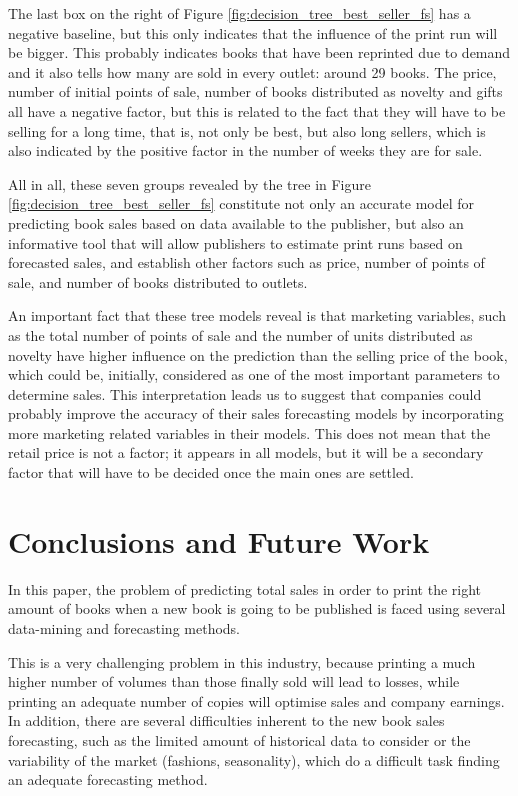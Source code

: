 \documentclass[a4paper,10pt,twocolumn,preprint,3p]{elsarticle}
\begin{document}
The last box on the right of Figure
\ref{fig:decision_tree_best_seller_fs} has a negative baseline, but
this only indicates that the influence of the print run will be
bigger. This probably indicates books that have been reprinted due to
demand and it also tells how many are sold in every outlet: around 29
books. The price, number of initial points of sale, number of books
distributed as novelty and gifts all have a negative factor, but this
is related to the fact that they will have to be selling for a long
time, that is, not only be best, but also long sellers, which is also
indicated by the positive factor in the number of weeks they are for
sale. 

All in all, these seven groups revealed by the tree in Figure
\ref{fig:decision_tree_best_seller_fs} constitute not only an accurate
model for predicting book sales based on data available to the
publisher, but also an informative tool that will allow publishers to
estimate print runs based on forecasted sales, and establish other
factors such as price, number of points of sale, and number of books
distributed to outlets. 

An important fact that these tree models reveal is that marketing
variables, such as the total number of points of sale and the number
of units distributed as novelty have higher influence on the
prediction than the selling price of the book, which could be,
initially, considered as one of the most important parameters to
determine sales. This interpretation leads us to suggest that
companies could probably improve the accuracy of their sales
forecasting models by incorporating more marketing related variables
in their models. This does not mean that the retail price is not a
factor; it appears in all models, but it will be a secondary factor
that will have to be decided once the main ones are settled. 


\section{Conclusions and Future Work}
\label{sec:conclusionsAndFutureWork}

In this paper, the problem of 
predicting total sales in order to print the right amount of books
when a new book is going to be published is faced using several data-mining 
and forecasting methods.

This is a very challenging problem in this industry, because printing
a much higher 
number of volumes than those finally sold will lead to losses, while
printing an adequate number of copies will optimise sales and company
earnings.  
In addition, there are several difficulties inherent to the new book
sales forecasting, such as the limited amount of historical data to
consider or the variability of the market (fashions, seasonality),
which do a difficult task finding an adequate forecasting method. 
\end{document}
